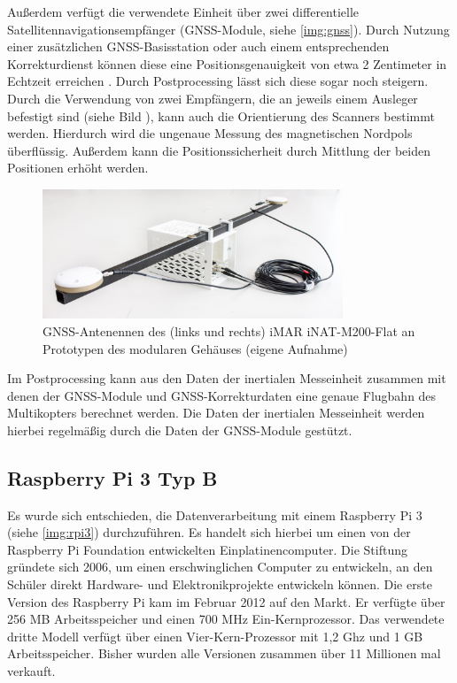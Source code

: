 \documentclass[a4paper,12pt,bibliography=totoc, listof=totoc,titlepage,pointlessnumbers]{scrreprt}
\begin{document}
Außerdem verfügt die verwendete Einheit über zwei differentielle Satellitennavigationsempfänger (GNSS-Module, siehe \autoref{img:gnss}). Durch Nutzung einer zusätzlichen GNSS-Basisstation oder auch einem entsprechenden Korrekturdienst können diese eine Positionsgenauigkeit von etwa 2 Zentimeter in Echtzeit erreichen \citep{imar}. Durch Postprocessing lässt sich diese sogar noch steigern. \citet{wilken}  Durch die Verwendung von zwei Empfängern, die an jeweils einem Ausleger befestigt sind (siehe Bild ), kann auch die Orientierung des Scanners bestimmt werden. Hierdurch wird die ungenaue Messung des magnetischen Nordpols überflüssig. Außerdem kann die Positionssicherheit durch Mittlung der beiden Positionen erhöht werden.

\begin{figure}[ht!]
 \centering
 \includegraphics[width=0.8\textwidth]{./img/gnss.jpg}
 \caption{GNSS-Antenennen des (links und rechts) iMAR iNAT-M200-Flat an Prototypen des modularen Gehäuses (eigene Aufnahme)}
 \label{img:gnss}
\end{figure}

Im Postprocessing kann aus den Daten der inertialen Messeinheit zusammen mit denen der GNSS-Module und GNSS-Korrekturdaten eine genaue Flugbahn des Multikopters berechnet werden. Die Daten der inertialen Messeinheit werden hierbei regelmäßig durch die Daten der GNSS-Module gestützt.

\subsection{Raspberry Pi 3 Typ B}
\label{ss:Raspberry}
Es wurde sich entschieden, die Datenverarbeitung mit einem Raspberry Pi 3 (siehe \autoref{img:rpi3}) durchzuführen. Es handelt sich hierbei um einen von der Raspberry Pi Foundation entwickelten Einplatinencomputer. Die Stiftung gründete sich 2006, um einen erschwinglichen Computer zu entwickeln, an den Schüler direkt Hardware- und Elektronikprojekte entwickeln können. Die erste Version des Raspberry Pi kam im Februar 2012 auf den Markt. Er verfügte über 256 MB Arbeitsspeicher und einen 700 MHz Ein-Kernprozessor. Das verwendete dritte Modell verfügt über einen Vier-Kern-Prozessor mit 1,2 Ghz und 1 GB Arbeitsspeicher. Bisher wurden alle Versionen zusammen über 11 Millionen mal verkauft. \citep{heise5Rasp}
\end{document}

